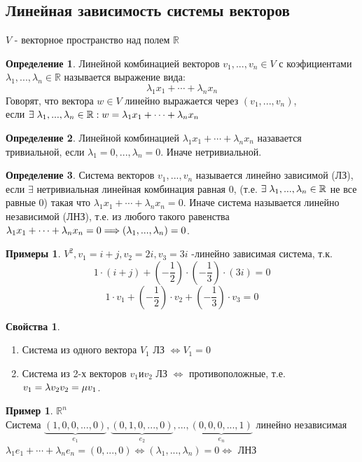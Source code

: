 \documentclass[a4paper, 12pt]{article}
\newcommand{\R}{\mathbb R}
\newcommand\tab[1][.5cm]{\hspace*{#1}}
\theoremstyle{definition}
\newtheorem*{definition}{Определение}
\newtheorem*{example}{Примеры}
\newtheorem*{example1}{Пример}
\newtheorem*{properties}{Свойства}
\begin{document}
  \newpage
  \subsection{Линейная зависимость системы векторов}
  $V$ - векторное пространство над полем $\R$
  \begin{definition}
    Линейной комбинацией векторов $v_1,...,v_n \in V$ с коэфициентами $\lambda_1,...,\lambda_n \in \R$ называется выражение вида: 
    $$\lambda_1 x_1 + \cdots + \lambda_n x_n$$ 
    Говорят, что вектора $w \in V$ линейно выражается через $(v_1,...,v_n)$, \\ если $\exists\tab[0.1cm]\lambda_1,...,\lambda_n \in \R: w = \lambda_1 x_1 + \cdots + \lambda_n x_n$   
  \end{definition}   
  \begin{definition}
    Линейной комбинацией $\lambda_1 x_1 + \cdots + \lambda_n x_n$ назавается тривиальной, если $\lambda_1 = 0,...,\lambda_n = 0$. Иначе нетривиальной.
  \end{definition}
  \begin{definition}
    Система векторов $v_1,...,v_n$ называется линейно зависимой (ЛЗ), если $\exists$ нетривиальная линейная комбинация равная 0, (т.е. $\exists \tab[0.1cm]\lambda_1,...,\lambda_n \in \R$ не все равные 0) такая что $\lambda_1 x_1 + \cdots + \lambda_n x_n = 0$. Иначе система называется линейно независимой (ЛНЗ), т.е. из любого такого равенства $\lambda_1 x_1 + \cdots + \lambda_n x_n = 0 \\ \Longrightarrow (\lambda_1,...,\lambda_n) = 0$.
  \end{definition}
  \begin{example}
    $V^2, v_1 = i + j, v_2 = 2i, v_3 = 3i$ -линейно зависимая система, т.к. $$1 \cdot (i + j) + (- \frac{1}{2}) \cdot (-\frac{1}{3}) \cdot (3i) = 0$$ $$1 \cdot v_1 + (-\frac{1}{2}) \cdot v_2 + (-\frac{1}{3}) \cdot v_3 = 0$$  
  \end{example}  
  \begin{properties} \end{properties} 
    \begin{enumerate}
      \item Система из одного вектора $V_1$ ЛЗ $\Longleftrightarrow V_1 = 0$  
      \item Система из 2-х векторов $v_1 \text{и} v_2$ ЛЗ $\Longleftrightarrow$ противоположные, т.е. $v_1 = \lambda v_2 \\ v_2 = \mu v_1$. 
    \end{enumerate}
  \begin{example1}
    $\R^n$ \\
    Система $\underbrace{(1,0,0,...,0)}_{e_1} , \underbrace{(0,1,0,...,0)}_{e_2},...,\underbrace{(0,0,0,...,1)}_{e_n}$ линейно независимая \\
    $\lambda_1 e_1 + \cdots + \lambda_n e_n = (0,...,0) \Longleftrightarrow (\lambda_1,...,\lambda_n) = 0 \Longleftrightarrow $ ЛНЗ 
  \end{example1}
\end{document}
